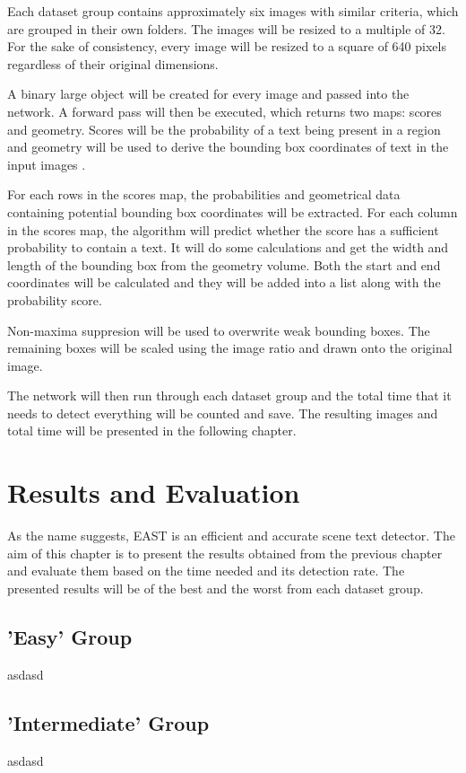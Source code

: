 \documentclass[10pt, a4paper]{article}
\begin{document}
Each dataset group contains approximately six images with similar criteria, which are grouped in their own folders. The images will be resized to a multiple of 32. For the sake of consistency, every image will be resized to a square of 640 pixels regardless of their original dimensions.

A binary large object will be created for every image and passed into the network. A forward pass will then be executed, which returns two maps: scores and geometry. 
Scores will be the probability of a text being present in a region and geometry will be used to derive the bounding box coordinates of text in the input images \citep{Rosebrockeast}.

For each rows in the scores map, the probabilities and geometrical data containing potential bounding box coordinates will be extracted.
For each column in the scores map, the algorithm will predict whether the score has a sufficient probability to contain a text. It will do some calculations and get the width and length of the bounding box from the geometry volume. Both the start and end coordinates will be calculated and they will be added into a list along with the probability score.

Non-maxima suppresion will be used to overwrite weak bounding boxes. The remaining boxes will be scaled using the image ratio and drawn onto the original image.

The network will then run through each dataset group and the total time that it needs to detect everything will be counted and save.
The resulting images and total time will be presented in the following chapter.

\clearpage
\section{Results and Evaluation} %
\label{sec:evaluation}
As the name suggests, EAST is an efficient and accurate scene text detector. The aim of this chapter is to present the results obtained from the previous chapter and evaluate them based on the time needed and its detection rate. The presented results will be of the best and the worst from each dataset group.
\subsection{'Easy' Group} %
\label{sub:easy}
asdasd
\subsection{'Intermediate' Group} %
\label{sub:inter}
asdasd
\end{document}
